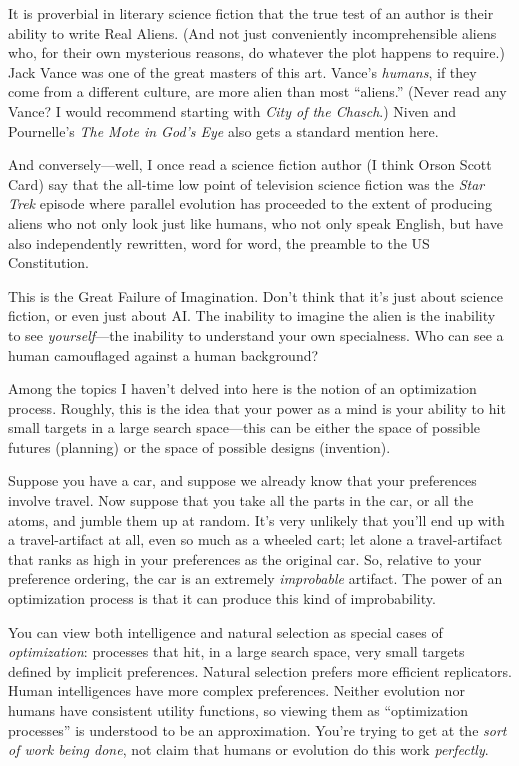 {
 It is proverbial in literary science fiction that the true test of
an author is their ability to write Real Aliens. (And not just
conveniently incomprehensible aliens who, for their own mysterious
reasons, do whatever the plot happens to require.) Jack Vance was one
of the great masters of this art. Vance's
\textit{humans}, if they come from a different culture, are more alien
than most ``aliens.'' (Never read
any Vance? I would recommend starting with \textit{City of the
Chasch}.) Niven and Pournelle's \textit{The Mote in
God's Eye} also gets a standard mention here.}

{
 And conversely---well, I once read a science fiction author (I
think Orson Scott Card) say that the all-time low point of television
science fiction was the \textit{Star Trek} episode where parallel
evolution has proceeded to the extent of producing aliens who not only
look just like humans, who not only speak English, but have also
independently rewritten, word for word, the preamble to the US
Constitution.}

{
 This is the Great Failure of Imagination. Don't
think that it's just about science fiction, or even
just about AI. The inability to imagine the alien is the inability to
see \textit{yourself}{}---the inability to understand your own
specialness. Who can see a human camouflaged against a human
background?}

\myendsectiontext


{
 Among the topics I haven't delved into here is the
notion of an optimization process. Roughly, this is the idea that your
power as a mind is your ability to hit small targets in a large search
space---this can be either the space of possible futures (planning) or
the space of possible designs (invention).}

{
 Suppose you have a car, and suppose we already know that your
preferences involve travel. Now suppose that you take all the parts in
the car, or all the atoms, and jumble them up at random.
It's very unlikely that you'll end up
with a travel-artifact at all, even so much as a wheeled cart; let
alone a travel-artifact that ranks as high in your preferences as the
original car. So, relative to your preference ordering, the car is an
extremely \textit{improbable} artifact. The power of an optimization
process is that it can produce this kind of improbability.}

{
 You can view both intelligence and natural selection as special
cases of \textit{optimization}: processes that hit, in a large search
space, very small targets defined by implicit preferences. Natural
selection prefers more efficient replicators. Human intelligences have
more complex preferences. Neither evolution nor humans have consistent
utility functions, so viewing them as ``optimization
processes'' is understood to be an approximation.
You're trying to get at the \textit{sort of work being
done}, not claim that humans or evolution do this work
\textit{perfectly}.}


